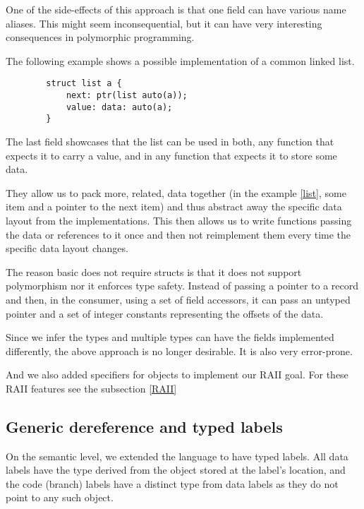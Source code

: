 One of the side-effects of this approach is that one field can have various name aliases. This might seem inconsequential, but it can have very interesting consequences in polymorphic programming.

\begin{ex}
    \label{list}
    The following example shows a possible implementation of a common linked list.

    \begin{lstlisting}
        struct list a {
            next: ptr(list auto(a));
            value: data: auto(a);
        }
    \end{lstlisting}

    The last field showcases that the list can be used in both, any function that expects it to carry a value, and in any function that expects it to store some data.
\end{ex}

They allow us to pack more, related, data together (in the example \ref{list}, some item and a pointer to the next item) and thus abstract away the specific data layout from the implementations. This then allows us to write functions passing the data or references to it once and then not reimplement them every time the specific data layout changes.

The reason basic \cmm does not require structs is that it does not support polymorphism nor it enforces type safety. Instead of passing a pointer to a record and then, in the consumer, using a set of field accessors, it can pass an untyped pointer and a set of integer constants representing the offsets of the data.

Since we infer the types and multiple types can have the fields implemented differently, the above approach is no longer desirable. It is also very error-prone.

And we also added  specifiers for  objects to implement our RAII goal. For these RAII features see the subsection \ref{RAII}

\subsection{Generic dereference and typed labels}

On the semantic level, we extended the language to have typed labels. All data labels have the type derived from the object stored at the label's location, and the code (branch) labels have a distinct type from data labels as they do not point to any such object.

